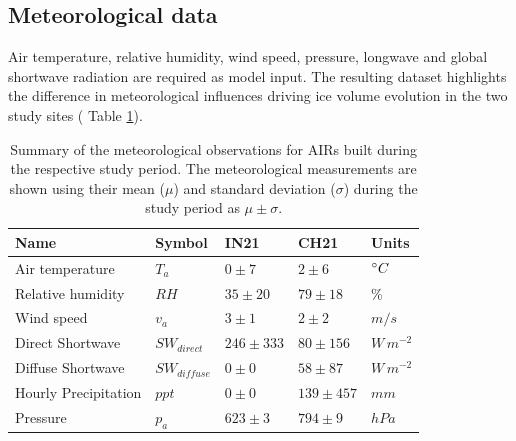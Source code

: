 \subsection{Meteorological data}

Air temperature, relative humidity, wind speed, pressure, longwave and global shortwave radiation are required
as model input.  The resulting dataset highlights the difference in meteorological influences driving ice volume
evolution in the two study sites ( Table \ref{tab:Observations}).


\begin{table}
	\centering
	\caption{Summary of the meteorological observations for \ac{AIRs} built during the respective study period.
		The meteorological measurements are shown using their mean ($\mu$) and standard deviation ($\sigma$) during the study
		period as $\mu \pm \sigma$. }

	\label{tab:Observations}
	\begin{tabular}{|lllll|}
		\hline
		\textbf{Name}        & \textbf{Symbol} & \textbf{IN21} & \textbf{CH21} & \textbf{Units} \\ \hline
		Air temperature      & $T_a    $       & $0 \pm 7$     & $2 \pm 6$     & $^{\circ} C$    \\
		Relative humidity    & $RH     $       & $35 \pm 20$   & $79 \pm 18$   & \%             \\
		Wind speed           & $v_a        $   & $3 \pm 1$     & $2 \pm 2$     & $m/s$          \\
		Direct Shortwave     & $SW_{direct} $  & $246 \pm 333$ & $80 \pm 156$  & $W\,m^{-2}$    \\
		Diffuse Shortwave    & $SW_{diffuse}$  & $0 \pm 0$     & $58 \pm 87$   & $W\,m^{-2}$    \\
		Hourly Precipitation & $ppt        $   & $0 \pm 0$     & $139 \pm 457$ & $mm$           \\
		Pressure             & $p_a         $  & $623 \pm 3$   & $794 \pm 9$   & $hPa$          \\\hline
	\end{tabular}
\end{table}


